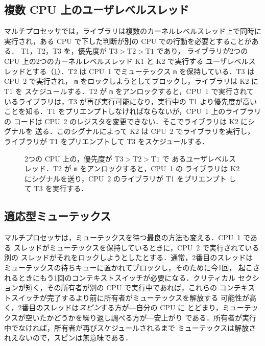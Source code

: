 \documentclass[../main.tex]{subfiles}
\begin{document}
\subsection{複数 CPU 上のユーザレベルスレッド}

マルチプロセッサでは，ライブラリは複数のカーネルレベルスレッド上で同時に
実行され，ある CPU で下した判断が別の CPU での行動を必要とすることがある．
T1，T2，T3 を，優先度が $\text{T3} > \text{T2} > \text{T1}$ であり，
ライブラリが2つの CPU 上の2つのカーネルレベルスレッド K1 と K2 で実行する
ユーザレベルスレッドとする（\cref{fig:l05-multi-cpu}）．T2 は
CPU~1 でミューテックス \texttt{m} を保持している．T3 は CPU~2 で実行され，
\texttt{m} をロックしようとしてブロックし，ライブラリは K2 に T1 を
スケジュールする．T2 が \texttt{m} をアンロックすると，CPU~1 で実行されて
いるライブラリは，T3 が再び実行可能になり，実行中の T1 より優先度が高い
ことを知る．T1 をプリエンプトしなければならないが，CPU~1 上のライブラリの
コードは CPU~2 のレジスタを変更できない．そこでライブラリは K2 にシグナルを
送る．このシグナルによって K2 は CPU~2 でライブラリを実行し，ライブラリが
T1 をプリエンプトして T3 をスケジュールする．

\begin{figure}[htbp]
  \centering
  
  \caption{2つの CPU 上の，優先度が $\text{T3} > \text{T2} > \text{T1}$ で
    あるユーザレベルスレッド．T2 が \texttt{m} をアンロックすると，CPU~1 の
    ライブラリは K2 にシグナルを送り，CPU~2 のライブラリが T1 をプリエンプト
    して T3 を実行する．}
  \label{fig:l05-multi-cpu}
\end{figure}

\subsection{適応型ミューテックス}

マルチプロセッサは，ミューテックスを待つ最良の方法も変える．CPU~1 である
スレッドがミューテックスを保持しているときに，CPU~2 で実行されている別の
スレッドがそれをロックしようとしたとする．通常，2番目のスレッドは
ミューテックスの待ちキューに置かれてブロックし，そのために今1回，
起こされるときにもう1回のコンテキストスイッチが必要になる．クリティカル
セクションが短く，その所有者が別の CPU で実行中であれば，これらの
コンテキストスイッチが完了するより前に所有者がミューテックスを解放する
可能性が高く，2番目のスレッドは\emph{スピン}する方が---自分の CPU に
とどまり，ミューテックスが空いたかどうかを繰り返し調べる方が---安上がり
である．所有者が実行中でなければ，所有者が再びスケジュールされるまで
ミューテックスは解放されえないので，スピンは無意味である．
\end{document}
